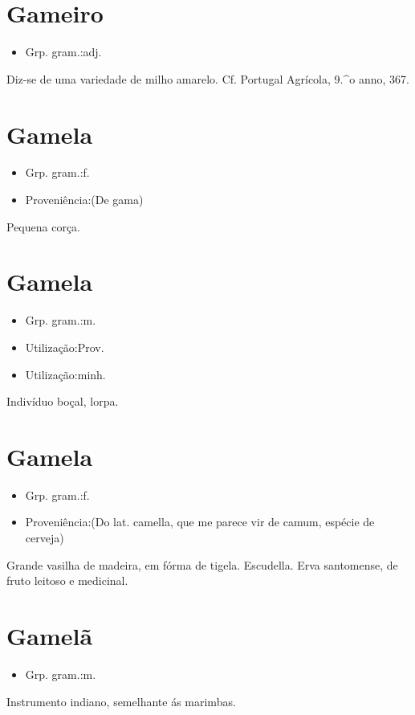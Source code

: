 \section{Gameiro}
\begin{itemize}
\item {Grp. gram.:adj.}
\end{itemize}
Diz-se de uma variedade de milho amarelo. Cf. \textunderscore Portugal Agrícola\textunderscore , 9.^o anno, 367.
\section{Gamela}
\begin{itemize}
\item {Grp. gram.:f.}
\end{itemize}
\begin{itemize}
\item {Proveniência:(De \textunderscore gama\textunderscore )}
\end{itemize}
Pequena corça.
\section{Gamela}
\begin{itemize}
\item {Grp. gram.:m.}
\end{itemize}
\begin{itemize}
\item {Utilização:Prov.}
\end{itemize}
\begin{itemize}
\item {Utilização:minh.}
\end{itemize}
Indivíduo boçal, lorpa.
\section{Gamela}
\begin{itemize}
\item {Grp. gram.:f.}
\end{itemize}
\begin{itemize}
\item {Proveniência:(Do lat. \textunderscore camella\textunderscore , que me parece vir de \textunderscore camum\textunderscore , espécie de cerveja)}
\end{itemize}
Grande vasilha de madeira, em fórma de tigela.
Escudella.
Erva santomense, de fruto leitoso e medicinal.
\section{Gamelã}
\begin{itemize}
\item {Grp. gram.:m.}
\end{itemize}
Instrumento indiano, semelhante ás marimbas.
